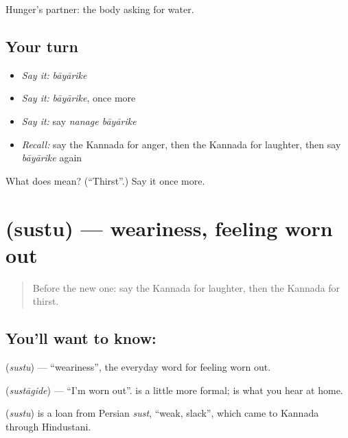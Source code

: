 \begin{grammarlens}[title={What you've built}]
Hunger's partner: the body asking for water.
\end{grammarlens}

\subsection*{Your turn}
\begin{itemize}
\raggedright
  \item \emph{Say it:} \emph{bāyārike}
  \item \emph{Say it:} \emph{bāyārike}, once more
  \item \emph{Say it:} say \emph{nanage bāyārike}
  \item \emph{Recall:} say the Kannada for anger, then the Kannada for laughter, then say \emph{bāyārike} again
\end{itemize}

\begin{tcolorbox}[breakable,colback=teal!4,colframe=teal!35!black,title={Before you move on}]
What does  mean? (\textquotedblleft{}Thirst\textquotedblright{}.) Say it once more.
\end{tcolorbox}
\section[\texorpdfstring{\kn{ಸುಸ್ತು} (sustu)}{ಸುಸ್ತು (sustu)}]{ (sustu) — weariness, feeling worn out}

\label{lesson:KA-C84-weariness}



\begin{quote}
Before the new one: say the Kannada for laughter, then the Kannada for thirst.
\end{quote}

\subsection*{You'll want to know: }
\textbf{} (\emph{sustu}) — \textquotedblleft{}weariness\textquotedblright{}, the everyday word for feeling worn out.

\textbf{} (\emph{sustāgide}) — \textquotedblleft{}I'm worn out\textquotedblright{}. \textbf{} is a little more formal; \textbf{} is what you hear at home.

\begin{cousinweb}
\textbf{} (\emph{sustu}) is a loan from Persian \emph{sust}, \textquotedblleft{}weak, slack\textquotedblright{}, which came to Kannada through Hindustani.
\end{cousinweb}

